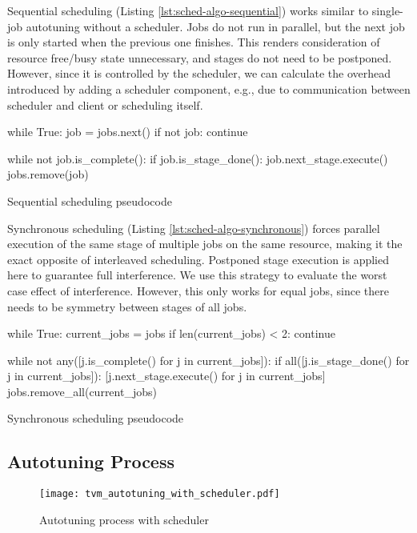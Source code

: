 Sequential scheduling (Listing \ref{lst:sched-algo-sequential}) works similar to single-job autotuning without a scheduler. Jobs do not run in parallel, but the next job is only started when the previous one finishes. This renders consideration of resource free/busy state unnecessary, and stages do not need to be postponed. However, since it is controlled by the scheduler, we can calculate the overhead introduced by adding a scheduler component, e.g., due to communication between scheduler and client or scheduling itself.

\begin{listing}
\begin{pythoncode}
while True:
    job = jobs.next()
    if not job:
        continue

    while not job.is_complete():
        if job.is_stage_done():
            job.next_stage.execute()
    jobs.remove(job)
\end{pythoncode}
\unskip
\caption{Sequential scheduling pseudocode}
\label{lst:sched-algo-sequential}
\end{listing}

Synchronous scheduling (Listing \ref{lst:sched-algo-synchronous}) forces parallel execution of the same stage of multiple jobs on the same resource, making it the exact opposite of interleaved scheduling. Postponed stage execution is applied here to guarantee full interference. We use this strategy to evaluate the worst case effect of interference. However, this only works for equal jobs, since there needs to be symmetry between stages of all jobs.

\begin{listing}
\begin{pythoncode}
while True:
    current_jobs = jobs
    if len(current_jobs) < 2:
        continue

    while not any([j.is_complete() for j in current_jobs]):
        if all([j.is_stage_done() for j in current_jobs]):
            [j.next_stage.execute() for j in current_jobs]
    jobs.remove_all(current_jobs)
\end{pythoncode}
\unskip
\caption{Synchronous scheduling pseudocode}
\label{lst:sched-algo-synchronous}
\end{listing}

\subsection{Autotuning Process}
\begin{figure}[ht]
	\centering
	\texttt{[image: tvm\_autotuning\_with\_scheduler.pdf]}%
	\caption{Autotuning process with scheduler}
	\label{fig:tvm-autotuning-with-scheduler}
\end{figure}

